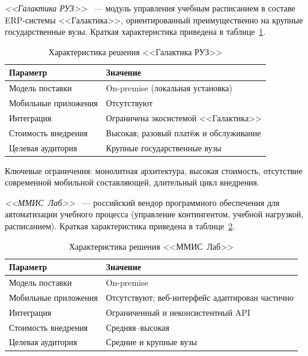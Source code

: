 \emph{<<Галактика РУЗ>>}~\cite{galaktika-ruz} --- модуль управления учебным расписанием в составе ERP-системы <<Галактика>>, ориентированный преимущественно на крупные государственные вузы. Краткая характеристика приведена в таблице~\ref{tab:galaktika}.

\begin{table}[h]
  \caption{Характеристика решения <<Галактика РУЗ>>}
  \label{tab:galaktika}
  \centering
  \begin{tabular}{p{} p{}}
    \toprule
    Параметр & Значение \\
    \midrule
    Модель поставки & On-premise (локальная установка) \\
    Мобильные приложения & Отсутствуют \\
    Интеграция & Ограничена экосистемой <<Галактика>> \\
    Стоимость внедрения & Высокая; разовый платёж и обслуживание \\
    Целевая аудитория & Крупные государственные вузы \\
    \bottomrule
  \end{tabular}
\end{table}

Ключевые ограничения: монолитная архитектура, высокая стоимость, отсутствие современной мобильной составляющей, длительный цикл внедрения.

\emph{<<ММИС~Лаб>>}~\cite{mmis-lab} --- российский вендор программного обеспечения для автоматизации учебного процесса (управление контингентом, учебной нагрузкой, расписанием). Краткая характеристика приведена в таблице~\ref{tab:mmis}.

\begin{table}[h]
  \caption{Характеристика решения <<ММИС~Лаб>>}
  \label{tab:mmis}
  \centering
  \begin{tabular}{p{} p{}}
    \toprule
    Параметр & Значение \\
    \midrule
    Модель поставки & On-premise \\
    Мобильные приложения & Отсутствуют; веб-интерфейс адаптирован частично \\
    Интеграция & Ограниченный и неконсистентный API \\
    Стоимость внедрения & Средняя--высокая \\
    Целевая аудитория & Средние и крупные вузы \\
    \bottomrule
  \end{tabular}
\end{table}

